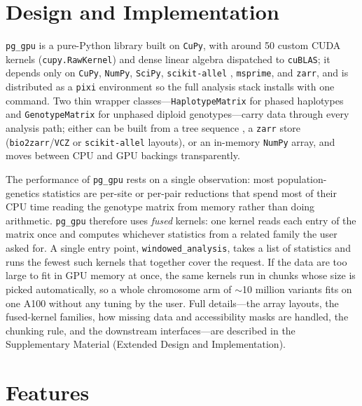 \documentclass[12pt]{article}
\newcommand{\citep}{\parencite}
\newcommand{\pggpu}{\texttt{pg\_gpu}\xspace}
\newcommand{\scikitallel}{\texttt{scikit-allel}\xspace}
\newcommand{\cupy}{\texttt{CuPy}\xspace}
\newcommand{\numpy}{\texttt{NumPy}\xspace}
\newcommand{\scipy}{\texttt{SciPy}\xspace}
\newcommand{\msprime}{\texttt{msprime}\xspace}
\newcommand{\zarr}{\texttt{zarr}\xspace}
\newcommand{\biotzarr}{\texttt{bio2zarr}\xspace}
\newcommand{\vcz}{\texttt{VCZ}\xspace}
\newcommand{\pixi}{\texttt{pixi}\xspace}
\newcommand{\cublas}{\texttt{cuBLAS}\xspace}
\begin{document}
\section*{Design and Implementation}

\pggpu is a pure-Python library built on \cupy \citep{cupy2017}, with
around 50 custom CUDA kernels (\texttt{cupy.RawKernel}) and dense
linear algebra dispatched to \cublas; it depends only on \cupy,
\numpy \citep{harris2020}, \scipy \citep{virtanen2020}, \scikitallel
\citep{miles2024}, \msprime \citep{baumdicker2022}, and \zarr, and is
distributed as a \pixi environment so the full analysis stack installs
with one command. Two thin wrapper
classes---\texttt{HaplotypeMatrix} for phased haplotypes and
\texttt{GenotypeMatrix} for unphased diploid genotypes---carry data
through every analysis path; either can be built from a tree sequence
\citep{jeffery2026}, a \zarr store (\biotzarr/\vcz \citep{czech2024vcz}
or \scikitallel layouts), or an in-memory \numpy array, and moves
between CPU and GPU backings transparently.

The performance of \pggpu rests on a single observation: most
population-genetics statistics are per-site or per-pair reductions
that spend most of their CPU time reading the genotype matrix from
memory rather than doing arithmetic. \pggpu therefore uses
\emph{fused} kernels: one kernel reads each entry of the matrix once
and computes whichever statistics from a related family the user asked
for. A single entry point, \texttt{windowed\_analysis}, takes a list
of statistics and runs the fewest such kernels that together cover the
request. If the data are too large to fit in GPU memory at once, the
same kernels run in chunks whose size is picked automatically, so a
whole chromosome arm of $\sim$10 million variants fits on one A100
without any tuning by the user. Full details---the array layouts, 
the fused-kernel families, how missing data and accessibility masks 
are handled, the chunking rule, and the downstream interfaces---are 
described in the Supplementary Material (Extended Design and 
Implementation).

\section*{Features}
\end{document}
